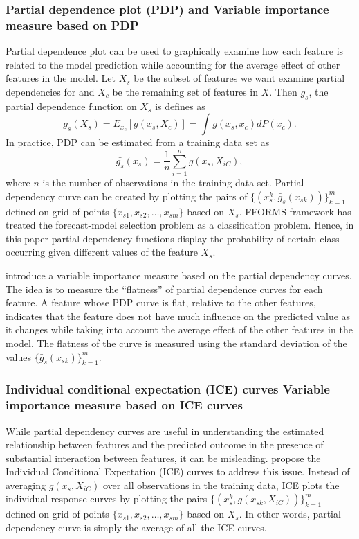 \documentclass[11pt,a4paper,]{article}
\begin{document}
\subsubsection{Partial dependence plot (PDP) and Variable importance
measure based on
PDP}\label{partial-dependence-plot-pdp-and-variable-importance-measure-based-on-pdp}

Partial dependence plot can be used to graphically examine how each
feature is related to the model prediction while accounting for the
average effect of other features in the model. Let \(X_s\) be the subset
of features we want examine partial dependencies for and \(X_c\) be the
remaining set of features in \(X\). Then \(g_s\), the partial dependence
function on \(X_s\) is defines as
\[g_s(X_s)=E_{x_c}[g(x_s, X_c)]=\int{g(x_s, x_c)dP(x_c).}\] In practice,
PDP can be estimated from a training data set as
\[\bar{g_s}(x_s)=\frac{1}{n}\sum_{i=1}^{n}g(x_s, X_{iC}),\] where \(n\)
is the number of observations in the training data set. Partial
dependency curve can be created by plotting the pairs of
\(\{(x_s^k, \bar{g}_s(x_{sk}))\}_{k=1}^{m}\) defined on grid of points
\(\{x_{s1}, x_{s2},\dots, x_{sm}\}\) based on \(X_s\). FFORMS framework
has treated the forecast-model selection problem as a classification
problem. Hence, in this paper partial dependency functions display the
probability of certain class occurring given different values of the
feature \(X_s\).

\textcite{Greenwell2018} introduce a variable importance measure based
on the partial dependency curves. The idea is to measure the
``flatness'' of partial dependence curves for each feature. A feature
whose PDP curve is flat, relative to the other features, indicates that
the feature does not have much influence on the predicted value as it
changes while taking into account the average effect of the other
features in the model. The flatness of the curve is measured using the
standard deviation of the values \(\{\bar{g}_{s}(x_{sk})\}_{k=1}^{m}\).

\subsubsection{Individual conditional expectation (ICE) curves Variable
importance measure based on ICE
curves}\label{individual-conditional-expectation-ice-curves-variable-importance-measure-based-on-ice-curves}

While partial dependency curves are useful in understanding the
estimated relationship between features and the predicted outcome in the
presence of substantial interaction between features, it can be
misleading. \textcite{goldstein2015peeking} propose the Individual
Conditional Expectation (ICE) curves to address this issue. Instead of
averaging \(g(x_s, X_{iC})\) over all observations in the training data,
ICE plots the individual response curves by plotting the pairs
\(\{(x_s^k, g(x_{sk}, X_{iC}))\}_{k=1}^{m}\) defined on grid of points
\(\{x_{s1}, x_{s2},\dots, x_{sm}\}\) based on \(X_s\). In other words,
partial dependency curve is simply the average of all the ICE curves.
\end{document}
